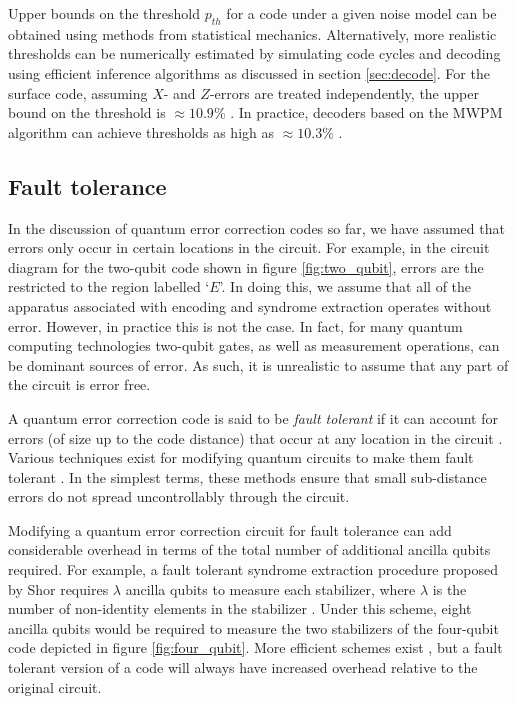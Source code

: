 \documentclass[]{arxiv}
\theoremstyle{plain}%
\theoremstyle{definition}
\theoremstyle{remark}
\begin{document}
Upper bounds on the threshold $p_{th}$ for a code under a given noise model can be obtained using methods from statistical mechanics. Alternatively, more realistic thresholds can be numerically estimated by simulating code cycles and decoding using efficient inference algorithms as discussed in section \ref{sec:decode}. For the surface code, assuming $X$- and $Z$-errors are treated independently, the upper bound on the threshold is $\approx10.9\%$ \cite{Dennis02}. In practice, decoders based on the MWPM algorithm can achieve thresholds as high as $\approx 10.3\%$ \cite{Criger18}.    







  


\subsection{Fault tolerance}

In the discussion of quantum error correction codes so far, we have assumed that errors only occur in certain locations in the circuit. For example, in the circuit diagram for the two-qubit code shown in figure \ref{fig:two_qubit}, errors are the restricted to the region labelled `$E$'. In doing this, we assume that all of the apparatus associated with encoding and syndrome extraction operates without error. However, in practice this is not the case. In fact, for many quantum computing technologies two-qubit gates, as well as measurement operations, can be dominant sources of error. As such, it is unrealistic to assume that any part of the circuit is error free.

A quantum error correction code is said to be \textit{fault tolerant} if it can account for errors (of size up to the code distance) that occur at any location in the circuit \cite{Gottesman98,Gottesman14}. Various techniques exist for modifying quantum circuits to make them fault tolerant \cite{Shor96,Steane97,DiVincenzo07}. In the simplest terms, these methods ensure that small sub-distance errors do not spread uncontrollably through the circuit.

Modifying a quantum error correction circuit for fault tolerance can add considerable overhead in terms of the total number of additional ancilla qubits required. For example, a fault tolerant syndrome extraction procedure proposed by Shor requires $\lambda$ ancilla qubits to measure each stabilizer, where $\lambda$ is the number of non-identity elements in the stabilizer \cite{Shor96}. Under this scheme, eight ancilla qubits would be required to measure the two stabilizers of the four-qubit code depicted in figure \ref{fig:four_qubit}. More efficient schemes exist \cite{Chao2018}, but a fault tolerant version of a code will always have increased overhead relative to the original circuit. 
\end{document}
